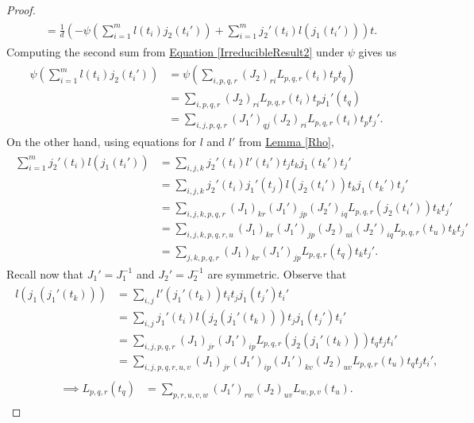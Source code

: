 \begin{proof}
\begin{align*}
\begin{split}
&= \frac{1}{d}\left(-\psi\left(\sum_{i=1}^m l(t_i)j_2(t_i')\right) + \sum_{i=1}^m j_2'(t_i)l(j_1(t_i'))\right)t.
\end{split}
\end{align*}
\noindent Computing the second sum from \hyperref[IrreducibleResult2]{Equation \eqref*{IrreducibleResult2}} under $\psi$ gives us
\begin{align*}
\begin{split}
\psi\left(\sum_{i=1}^m l(t_i)j_2(t_i')\right) &= \psi\left(\sum_{i,p,q,r} (J_2)_{ri}L_{p,q,r}(t_i) t_pt_q\right)\\
&= \sum_{i,p,q,r} (J_2)_{ri}L_{p,q,r}(t_i) t_pj_1'(t_q)\\
&= \sum_{i,j,p,q,r} (J_1')_{qj}(J_2)_{ri}L_{p,q,r}(t_i) t_pt_j'.
\end{split}
\end{align*}
\noindent On the other hand, using equations for $l$ and $l'$ from \hyperref[Rho]{Lemma \ref*{Rho}},
\begin{align*}
\begin{split}
\sum_{i=1}^m j_2'(t_i)l(j_1(t_i')) &= \sum_{i,j,k} j_2'(t_i)l'(t_i')t_jt_k j_1(t_k')t_j'\\
&= \sum_{i,j,k} j_2'(t_i)j_1'(t_j)l(j_2(t_i'))t_k j_1(t_k')t_j'\\
&= \sum_{i,j,k,p,q,r} (J_1)_{kr}(J_1')_{jp}(J_2')_{iq}L_{p,q,r}(j_2(t_i'))t_kt_j'\\
&= \sum_{i,j,k,p,q,r,u} (J_1)_{kr}(J_1')_{jp}(J_2)_{ui}(J_2')_{iq}L_{p,q,r}(t_u)t_kt_j'\\
&= \sum_{j,k,p,q,r} (J_1)_{kr}(J_1')_{jp}L_{p,q,r}(t_q)t_kt_j'.
\end{split}
\end{align*}
\noindent Recall now that $J_1' = J_1^{-1}$ and $J_2' = J_2^{-1}$ are symmetric. Observe that
\begin{align*}
\begin{split}
l(j_1(j_1'(t_k))) &= \sum_{i,j} l'(j_1'(t_k))t_it_j j_1(t_j')t_i'\\
&= \sum_{i,j} j_1'(t_i)l(j_2(j_1'(t_k)))t_j j_1(t_j')t_i'\\
&= \sum_{i,j,p,q,r} (J_1)_{jr} (J_1')_{ip} L_{p,q,r}(j_2(j_1'(t_k))) t_qt_jt_i'\\
&= \sum_{i,j,p,q,r,u,v} (J_1)_{jr} (J_1')_{ip} (J_1')_{kv} (J_2)_{uv} L_{p,q,r}(t_u) t_qt_jt_i',
\end{split}
\end{align*}
\begin{align*}
\begin{split}
\implies L_{p,q,r}(t_q) &= \sum_{p,r,u,v,w} (J_1')_{rw} (J_2)_{uv} L_{w,p,v}(t_u).

\end{split}
\end{align*}
\end{proof}
